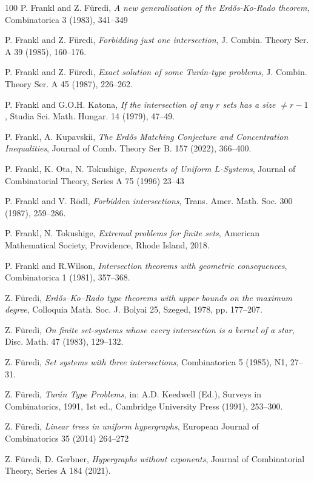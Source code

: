 \documentclass[graybox]{svmult}
\begin{document}
\begin{thebibliography}{100}
 P. Frankl and Z. F\"uredi, {\it A new generalization of the Erd\H os-Ko-Rado theorem}, Combinatorica 3 (1983), 341--349

 P. Frankl and Z. F\"uredi, {\it Forbidding just one intersection}, J. Combin.  Theory Ser. A 39 (1985), 160--176.

 P. Frankl and Z. F\"uredi, {\it Exact solution of some Tur\'an-type problems},  J. Combin.  Theory Ser. A 45 (1987), 226--262.

 P. Frankl and G.O.H. Katona, {\it If the intersection of any $r$ sets has a size $\neq r-1$}, Studia Sci. Math. Hungar. 14 (1979), 47--49.

 P. Frankl, A. Kupavskii,  {\it The Erd\H os Matching Conjecture and Concentration Inequalities}, Journal of Comb. Theory Ser B. 157 (2022), 366--400.

 P. Frankl, K. Ota, N. Tokushige, {\it Exponents of Uniform $L$-Systems}, Journal of Combinatorial Theory, Series A 75 (1996) 23--43

 P. Frankl and V. R\"odl, {\it Forbidden intersections}, Trans. Amer. Math. Soc. 300 (1987), 259--286.

 P. Frankl, N. Tokushige, {\it Extremal problems for finite sets}, American Mathematical Society, Providence, Rhode Island, 2018.

 P. Frankl and R.Wilson, {\it Intersection theorems with geometric consequences}, Combinatorica
1 (1981), 357--368.


 Z. F\"uredi, {\it Erd\H os--Ko--Rado type theorems with upper bounds on the maximum degree}, Colloquia Math. Soc. J. Bolyai 25, Szeged, 1978, pp. 177--207.

 Z. F\"uredi, {\it On finite set-systems whose every intersection is a kernel of a star}, Disc. Math. 47 (1983), 129--132.

 Z. F\"uredi, {\it Set systems with three intersections}, Combinatorica 5 (1985), N1, 27--31.

 Z. F\"uredi, {\it Tur\'an Type Problems,} in: A.D. Keedwell (Ed.), Surveys in Combinatorics, 1991, 1st ed., Cambridge University Press  (1991), 253--300.



 Z. F\"uredi, {\it Linear trees in uniform hypergraphs}, European Journal of Combinatorics 35 (2014) 264--272

 Z. F\"uredi, D. Gerbner, {\it Hypergraphs without exponents}, Journal of Combinatorial Theory, Series A 184 (2021).


\end{thebibliography}
\end{document}
